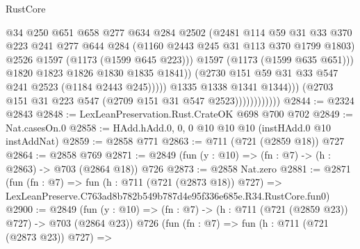 \begin{lexlean}{RustCore}
\begin{coremodule}
                                          @34
                                          @250
                                          @651
                                          @658
                                          @277
                                          @634
                                          @284
                                          @2502
                                          (@2481
                                            @114
                                            @59
                                            @31
                                            @33
                                            @370
                                            @223
                                            @241
                                            @277
                                            @644
                                            @284
                                            (@1160 @2443 @245 @31 @113 @370 @1799 @1803)
                                            @2526
                                            @1597
                                            (@1173 (@1599 @645 @223)))
                                          @1597
                                          (@1173 (@1599 @635 @651)))
                                        @1820
                                        @1823
                                        @1826
                                        @1830
                                        @1835
                                        @1841))
                                    (@2730 @151 @59 @31 @33 @547 @241 @2523 (@1184 @2443 @245)))))
                              @1335
                              @1338
                              @1341
                              @1344)))
                        (@2703 @151 @31 @223 @547 (@2709 @151 @31 @547 @2523))))))))))))
@2844 := @2324 @2843
@2848 := LexLeanPreservation.Rust.CrateOK @698 @700 @702
@2849 := Nat.casesOn.{0}
@2858 := HAdd.hAdd.{0, 0, 0} @10 @10 @10 (instHAdd.{0} @10 instAddNat)
@2859 := @2858 @771
@2863 := @711 (@721 (@2859 @18)) @727
@2864 := @2858 @769
@2871 := @2849 (fun (y : @10) => (fn : @7) -> (h : @2863) -> @703 (@2864 @18)) @726
@2873 := @2858 Nat.zero
@2881 := @2871
    (fun (fn : @7) =>
    fun (h : @711 (@721 (@2873 @18)) @727) =>
    LexLeanPreserve.C763ad8b782b549b787d4e95f336e685e.R34.RustCore.fun0)
@2900 := @2849
    (fun (y : @10) => (fn : @7) -> (h : @711 (@721 (@2859 @23)) @727) -> @703 (@2864 @23))
    @726
    (fun (fn : @7) =>
    fun (h : @711 (@721 (@2873 @23)) @727) =>

\end{coremodule}
\end{lexlean}

